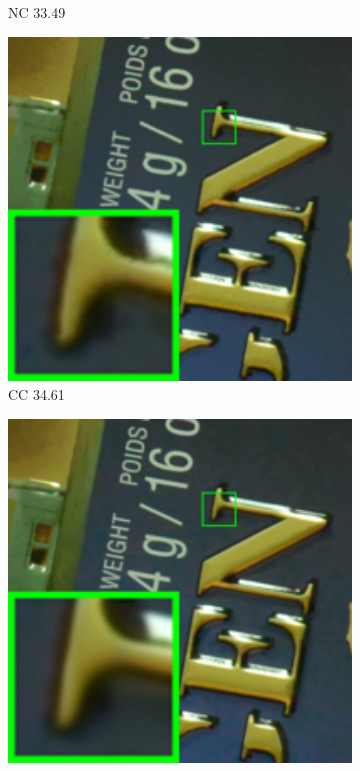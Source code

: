 \begin{figure}
\begin{subfigure}[t]{0.19\textwidth}
		\caption{NC 33.49}
    \end{subfigure}
    \hfill
    \begin{subfigure}[t]{0.19\textwidth}
        \centering
        \includegraphics[width=1\textwidth]{images/twsc/cc/resize_br_CCNoise_d800_iso6400_1.png}
		\caption{CC 34.61}
    \end{subfigure}
    \hfill
    \begin{subfigure}[t]{0.19\textwidth}
        \centering
        \includegraphics[width=1\textwidth]{images/twsc/cc/resize_br_TWSC_d800_iso6400_1.png}

\end{subfigure}
\end{figure}
